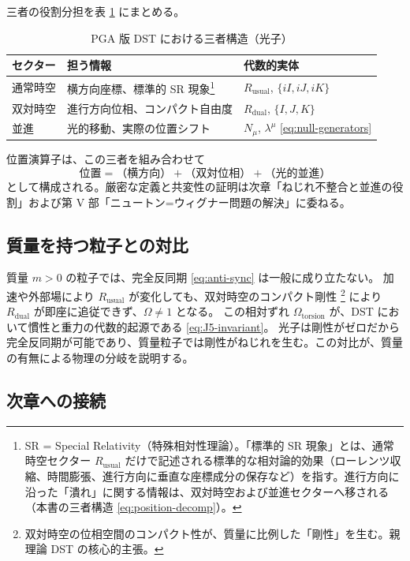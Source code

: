 \documentclass[dvipdfmx,a4paper,oneside]{jsbook}
\numberwithin{equation}{chapter}
\begin{document}
三者の役割分担を表 \ref{tab:triple-structure} にまとめる。

\begin{table}[htbp]
  \centering
  \caption{PGA 版 DST における三者構造（光子）}
  \label{tab:triple-structure}
  \begin{tabular}{@{}lll@{}}
    \toprule
    セクター & 担う情報 & 代数的実体 \\
    \midrule
    通常時空 & 横方向座標、標準的 SR 現象\footnote{SR = Special Relativity（特殊相対性理論）。「標準的 SR 現象」とは、通常時空セクター \(R_{\mathrm{usual}}\) だけで記述される標準的な相対論的効果（ローレンツ収縮、時間膨張、進行方向に垂直な座標成分の保存など）を指す。進行方向に沿った「潰れ」に関する情報は、双対時空および並進セクターへ移される（本書の三者構造 \eqref{eq:position-decomp}）。} & \(R_{\mathrm{usual}}\), \(\{iI,iJ,iK\}\) \\
    双対時空 & 進行方向位相、コンパクト自由度 & \(R_{\mathrm{dual}}\), \(\{I,J,K\}\) \\
    並進 & 光的移動、実際の位置シフト & \(N_\mu\), \(\lambda^\mu\) \eqref{eq:null-generators} \\
    \bottomrule
  \end{tabular}
\end{table}

位置演算子は、この三者を組み合わせて
\[
  \text{位置} = \text{（横方向）} + \text{（双対位相）} + \text{（光的並進）}
\]
として構成される。厳密な定義と共変性の証明は次章「ねじれ不整合と並進の役割」および第 V 部「ニュートン=ウィグナー問題の解決」に委ねる。

\subsection{質量を持つ粒子との対比}

質量 \(m > 0\) の粒子では、完全反同期 \eqref{eq:anti-sync} は一般に成り立たない。
加速や外部場により \(R_{\mathrm{usual}}\) が変化しても、双対時空のコンパクト剛性 \footnote{双対時空の位相空間のコンパクト性が、質量に比例した「剛性」を生む。親理論 DST の核心的主張。} により \(R_{\mathrm{dual}}\) が即座に追従できず、\(\Omega \neq 1\) となる。
この相対ずれ \(\Omega_{\mathrm{torsion}}\) が、DST において慣性と重力の代数的起源である \eqref{eq:J5-invariant}。
光子は剛性がゼロだから完全反同期が可能であり、質量粒子では剛性がねじれを生む。この対比が、質量の有無による物理の分岐を説明する。

\subsection{次章への接続}
\end{document}
